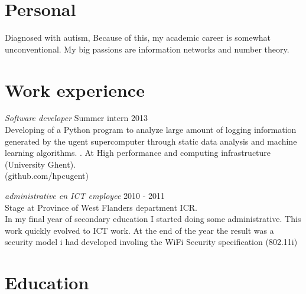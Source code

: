 \documentclass[margin, 10pt]{res} %
\begin{document}
\begin{resume}

 
\section{Personal}
Diagnosed with autism, Because of this, my academic career is somewhat unconventional. My big passions are information networks and number theory.
\section{Work experience}
{\sl Software developer} \hfill Summer intern 2013 \\

Developing of a Python program to analyze large amount of logging information generated by the ugent supercomputer through static data analysis and machine learning algorithms.
.
At High performance and computing infrastructure (University Ghent).\\ (github.com/hpcugent)

{\sl administrative en ICT employee} \hfill 2010 - 2011 \\
Stage at Province of West Flanders department ICR. \\
In my final year of secondary education I started doing some administrative. This work quickly evolved to ICT work. At the end of the year the result was a security model i had developed involing the WiFi Security specification (802.11i)

\section{Education}


\end{resume}
\end{document}
